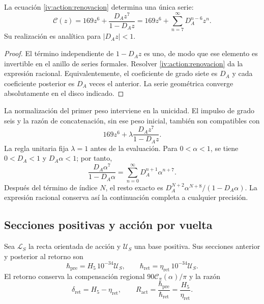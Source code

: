 \begin{proposition}
\label{iv:action:unicidad-renovacion}
La ecuación \eqref{iv:action:renovacion} determina una única serie:
\begin{equation}
 \mathscr C(z)=169z^6+\frac{D_Az^7}{1-D_Az}
             =169z^6+\sum_{n=7}^{\infty}D_A^{n-6}z^n.
 \label{iv:action:serie-renovacion}
\end{equation}
Su realización es analítica para \(|D_Az|<1\).
\end{proposition}
\begin{proof}
El término independiente de \(1-D_Az\) es uno, de modo que ese
elemento es invertible en el anillo de series formales.
Resolver \eqref{iv:action:renovacion} da la expresión racional.
Equivalentemente, el coeficiente de grado siete es \(D_A\) y cada
coeficiente posterior es \(D_A\) veces el anterior. La serie
geométrica converge absolutamente en el disco indicado.
\end{proof}

La normalización del primer peso interviene en la unicidad.
El impulso de grado seis y la razón de concatenación, sin ese
peso inicial, también son compatibles con
\[
 169z^6+\lambda\frac{D_Az^7}{1-D_Az}.
\]
La regla unitaria fija \(\lambda=1\) antes de la evaluación.
Para \(0<\alpha<1\), se tiene \(0<D_A<1\) y \(D_A\alpha<1\);
por tanto,
\begin{equation}
 \frac{D_A\alpha^7}{1-D_A\alpha}
   =\sum_{n=0}^{\infty}D_A^{n+1}\alpha^{n+7}.
 \label{iv:action:cola}
\end{equation}
Después del término de índice \(N\), el resto exacto es
\(D_A^{N+2}\alpha^{N+8}/(1-D_A\alpha)\). La expresión racional
conserva así la continuación completa a cualquier precisión.

\subsection{Secciones positivas y acción por vuelta}
\label{iv:action:secciones}

Sea \(\mathcal L_S\) la recta orientada de acción y
\(\mathcal U_S\) una base positiva. Sus secciones anterior y
posterior al retorno son
\begin{equation}
 \hbar_{\mathrm{pre}}=H_5\,10^{-34}\mathcal U_S,\qquad
 \hbar_{\mathrm{ret}}=\eta_{\mathrm{ret}}\,10^{-34}\mathcal U_S.
 \label{iv:action:hbar}
\end{equation}
El retorno conserva la compensación regional
\(90\mathcal C_\pi(\alpha)/\pi\) y la razón
\begin{equation}
 \delta_{\mathrm{ret}}=H_5-\eta_{\mathrm{ret}},\qquad
 R_{\mathrm{act}}=\frac{\hbar_{\mathrm{pre}}}
                        {\hbar_{\mathrm{ret}}}
                =\frac{H_5}{\eta_{\mathrm{ret}}}.
 \label{iv:action:razon}
\end{equation}

